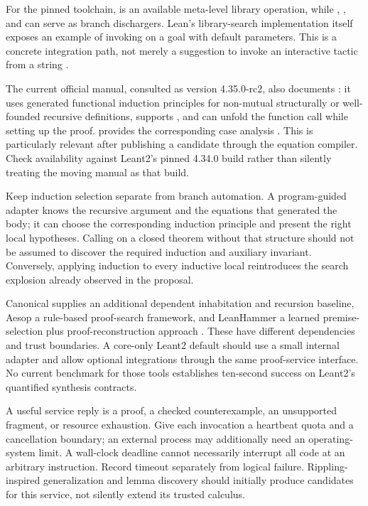 
For the pinned toolchain,  is an available meta-level
library operation, while , , and  can serve
as branch dischargers. Lean's library-search implementation itself exposes
an example of invoking  on a goal with default parameters.
This is a concrete integration path, not merely a suggestion to invoke an
interactive tactic from a string \cite{leaninduction,librarysearch}.

The current official manual, consulted as version 4.35.0-rc2, also documents
: it uses generated functional induction principles for
non-mutual structurally or well-founded recursive definitions, supports
, and can unfold the function call while setting up the
proof.  provides the corresponding case analysis
\cite{leantactics}. This is particularly relevant after publishing a candidate
through the equation compiler. Check availability against Leant2's pinned
4.34.0 build rather than silently treating the moving manual as that build.

Keep induction selection separate from branch automation. A program-guided
adapter knows the recursive argument and the equations that generated the
body; it can choose the corresponding induction principle and present the
right local hypotheses. Calling  on a closed theorem without that
structure should not be assumed to discover the required induction and
auxiliary invariant. Conversely, applying induction to every inductive local
reintroduces the search explosion already observed in the proposal.

Canonical supplies an additional dependent inhabitation and recursion baseline,
Aesop a rule-based proof-search framework, and LeanHammer a learned
premise-selection plus proof-reconstruction approach
\cite{canonical,aesop,leanhammer}. These have different dependencies and trust
boundaries. A core-only Leant2 default should use a small internal adapter and
allow optional integrations through the same proof-service interface. No
current benchmark for those tools establishes ten-second success on Leant2's
quantified synthesis contracts.

A useful service reply is a proof, a checked counterexample, an unsupported
fragment, or resource exhaustion. Give each invocation a heartbeat quota and
a cancellation boundary; an external process may additionally need an
operating-system limit. A wall-clock deadline cannot necessarily interrupt
all code at an arbitrary instruction. Record timeout separately from logical
failure. Rippling-inspired generalization and lemma discovery should initially
produce candidates for this service, not silently extend its trusted calculus.

